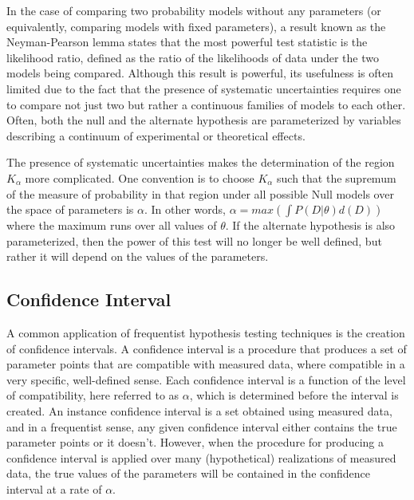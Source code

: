 In the case of comparing two probability models without any parameters (or equivalently, comparing models with fixed parameters), a result known as the Neyman-Pearson lemma states that the most powerful test statistic is the likelihood ratio, defined as the ratio of the likelihoods of data under the two models being compared.
Although this result is powerful, its usefulness is often limited due to the fact that the presence of systematic uncertainties requires one to compare not just two but rather a continuous families of models to each other.
Often, both the null and the alternate hypothesis are parameterized by variables describing a continuum of experimental or theoretical effects.

The presence of systematic uncertainties makes the determination of the region $K_{\alpha}$ more complicated.
One convention is to choose $K_{\alpha}$ such that the supremum of the measure of probability in that region under all possible Null models over the space of parameters is $\alpha$.
In other words, $\alpha = max( \int P(D|\theta) d(D) )$ where the maximum runs over all values of $\theta$.
If the alternate hypothesis is also parameterized, then the power of this test will no longer be well defined, but rather it will depend on the values of the parameters.


\subsection{Confidence Interval}

A common application of frequentist hypothesis testing techniques is the creation of confidence intervals.
A confidence interval is a procedure that produces a set of parameter points that are compatible with measured data, where compatible  in a very specific, well-defined sense.
Each confidence interval is a function of the level of compatibility, here referred to as $\alpha$, which is determined before the interval is created.
An instance confidence interval is a set obtained using measured data, and in a frequentist sense, any given confidence interval either contains the true parameter points or it doesn't.
However, when the procedure for producing a confidence interval is applied over many (hypothetical) realizations of measured data, the true values of the parameters will be contained in the confidence interval at a rate of $\alpha$.


